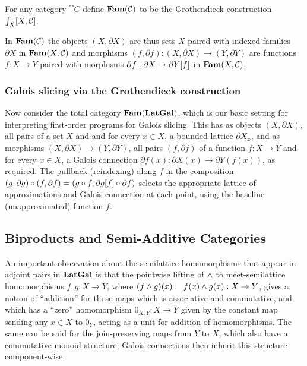 \begin{definition}
For any category $\cat{C}$ define $\mathbf{Fam}(\mathcal{C})$ to be the Grothendieck construction
$\int_{X}[X,\mathcal{C}]$.
\end{definition}

\noindent In $\mathbf{Fam}(\mathcal{C})$ the objects $(X, \partial X)$ are thus sets $X$ paired with indexed families
$\partial X$ in $\mathbf{Fam}(X,\mathcal{C})$ and morphisms $(f, \partial f): (X, \partial X) \to (Y, \partial Y)$ are
functions $f: X \to Y$ paired with morphisms $\partial f: \partial X \to \partial Y[f]$ in
$\mathbf{Fam}(X,\mathcal{C})$.

\subsubsection{Galois slicing via the Grothendieck construction}

Now consider the total category $\mathbf{Fam}(\mathbf{LatGal})$, which is our basic setting for interpreting first-order
programs for Galois slicing. This has as objects $(X, \partial X)$, all pairs of a set $X$ and and for every
$x \in X$, a bounded lattice $\partial X_x$, and as morphisms $(X, \partial X) \to (Y, \partial Y)$, all pairs
$(f, \partial f)$ of a function $f: X \to Y$ and for every $x \in X$, a Galois connection $\partial f(x):
\partial X(x) \to \partial Y(f(x))$, as required. The pullback (reindexing) along $f$ in the composition $(g,
\partial g) \circ (f, \partial f) = (g \circ f, \partial g[f] \circ \partial f)$ selects the
appropriate lattice of approximations and Galois connection at each point, using the baseline (unapproximated)
function $f$.

\subsection{Biproducts and Semi-Additive Categories}

An important observation about the semilattice homomorphisms that appear in adjoint pairs in $\mathbf{LatGal}$ is that
the pointwise lifting of $\wedge$ to meet-semilattice homomorphisms $f, g: X \to Y$, where $(f \wedge g)(x) =
f(x) \wedge g(x): X \to Y$, gives a notion of ``addition'' for those maps which is associative and commutative,
and which has a ``zero'' homomorphism $0_{X,Y}: X \to Y$ given by the constant map sending any $x \in X$ to
$0_Y$, acting as a unit for addition of homomorphisms. The same can be said for the join-preserving maps from
$Y$ to $X$, which also have a commutative monoid structure; Galois connections then inherit this structure
component-wise.

